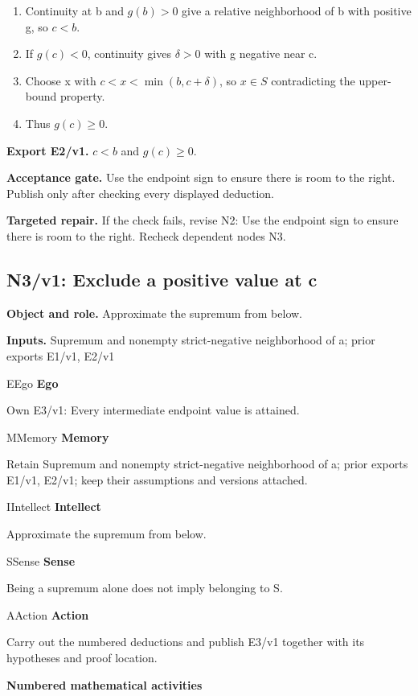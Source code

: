 \documentclass[preprint,12pt,aps,pra,showkeys,amsmath,amssymb,superscriptaddress,floatfix]{revtex4-2}
\theoremstyle{definition}
\theoremstyle{remark}
\newcommand{\mmfaculty}[3]{%
 \begin{mmfacultybox}{#1}{#2}
 {\sffamily\bfseries\color{MMBlue}#2}\par\smallskip #3
 \end{mmfacultybox}}
\newcommand{\field}[2]{\par\smallskip\noindent\textbf{#1.} #2\par}
\begin{document}
\begin{enumerate}[label=N2.\arabic*,leftmargin=3.4em]

\item Continuity at b and \(g(b)>0\) give a relative neighborhood of b with
positive g, so \(c<b\).

\item If \(g(c)<0\), continuity gives \(\delta >0\) with g negative near c.

\item Choose x with \(c<x<\operatorname{min} (b,c+\delta )\), so \(x\in S\)
contradicting the upper-bound property.

\item Thus \(g(c)\ge 0\).

\end{enumerate}

\field{Export E2/v1}{\(c<b\) and \(g(c)\ge 0\).}

\field{Acceptance gate}{Use the endpoint sign to ensure there is room to the right. Publish only
after checking every displayed deduction.}

\field{Targeted repair}{If the check fails, revise N2: Use the endpoint sign to ensure there is
room to the right. Recheck dependent nodes N3.}

\clearpage

\subsection{N3/v1: Exclude a positive value at c}

\field{Object and role}{Approximate the supremum from below.}

\field{Inputs}{Supremum and nonempty strict-negative neighborhood of a; prior exports
E1/v1, E2/v1}

\mmfaculty{E}{Ego}{Own E3/v1: Every intermediate endpoint value is attained.}

\mmfaculty{M}{Memory}{Retain Supremum and nonempty strict-negative neighborhood of a; prior
exports E1/v1, E2/v1; keep their assumptions and versions attached.}

\mmfaculty{I}{Intellect}{Approximate the supremum from below.}

\mmfaculty{S}{Sense}{Being a supremum alone does not imply belonging to S.}

\mmfaculty{A}{Action}{Carry out the numbered deductions and publish E3/v1 together with its
hypotheses and proof location.}

\smallskip\noindent\textbf{Numbered mathematical activities}
\end{document}
